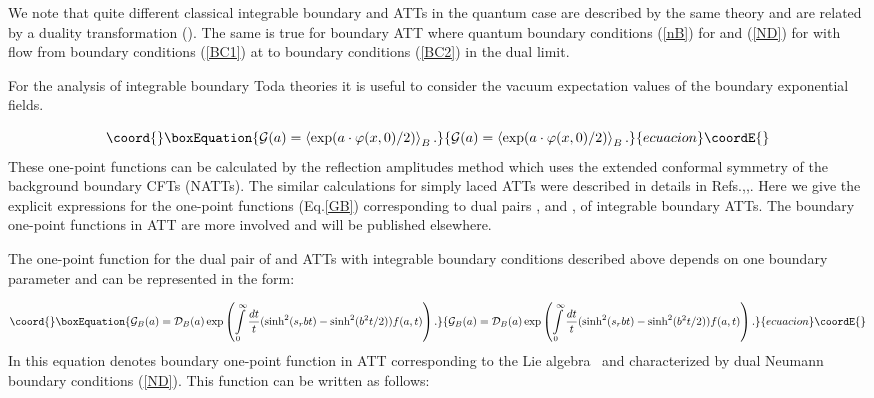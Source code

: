 \documentclass[a4paper,12pt,titlepage,final]{article}
\begin{document}
We note that quite different classical integrable
boundary \coordHE{} and \coordHE{} ATTs in the quantum case are
described by the same theory and are
related by a duality transformation (\coordHE{}). The same is true
for \coordHE{} boundary ATT where quantum boundary conditions (\ref{nB}) for
\coordHE{} and (\ref{ND}) for \coordHE{} with \coordHE{} flow from boundary
conditions (\ref{BC1}) at \coordHE{} to boundary conditions
(\ref{BC2}) in the dual limit.

For the analysis of integrable boundary Toda theories it is useful to
consider the vacuum expectation values of the boundary exponential fields.

\begin{equation}\coord{}\boxEquation{
\mathcal{G}(a)=\left\langle \exp (a\cdot \varphi (x,0)/2)\right\rangle _{B}.
\label{GB}
}{
\mathcal{G}(a)=\left\langle \exp (a\cdot \varphi (x,0)/2)\right\rangle _{B}.
}{ecuacion}\coordE{}\end{equation}
These one-point functions can be calculated by the reflection amplitudes
method \cite{FLZ} which uses the extended conformal symmetry of the
background boundary CFTs (NATTs). The similar calculations for simply laced
ATTs were described in details in Refs.\cite{FZZA},\cite{VAF},\cite{VFT}.
Here we give the
explicit expressions for the one-point functions (Eq.\ref{GB})
corresponding to dual pairs
\coordHE{}, \coordHE{}and \coordHE{}, \coordHE{} of integrable boundary
ATTs. The boundary one-point functions in \coordHE{} ATT are more involved and
will be published elsewhere.

The one-point function for the dual pair of \coordHE{} and \coordHE{} ATTs with integrable boundary conditions described above depends on
one boundary parameter \coordHE{} and can be represented in the form:

\begin{equation}\coord{}\boxEquation{
\mathcal{G}_{B}(a)=\mathcal{D}_{B}(a)\exp \left( \int\limits_{0}^{\infty }
\frac{dt}{t}(\sinh ^{2}(s_{r}bt)-\sinh ^{2}(b^{2}t/2))f(a,t)\right) .
\label{DB}
}{
\mathcal{G}_{B}(a)=\mathcal{D}_{B}(a)\exp \left( \int\limits_{0}^{\infty }
\frac{dt}{t}(\sinh ^{2}(s_{r}bt)-\sinh ^{2}(b^{2}t/2))f(a,t)\right) .
}{ecuacion}\coordE{}\end{equation}
In this equation \coordHE{} denotes boundary one-point function in
ATT corresponding to the Lie algebra \coordHE{} \ and characterized by dual
Neumann boundary conditions (\ref{ND}). This function can be written as
follows:
\end{document}
